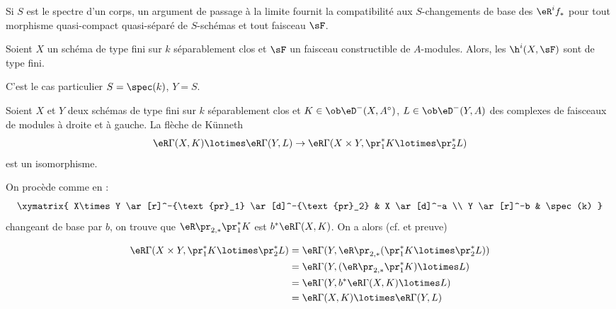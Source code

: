 Si $S$ est le spectre d'un corps, un argument de passage à la limite fournit 
la compatibilité aux $S$-changements de base des $\eR^i f_\ast$ pour tout 
morphisme quasi-compact quasi-séparé de $S$-schémas et tout faisceau 
$\sF$. 





\begin{corollary_}\label{VII:1-10}
Soient $X$ un schéma de type fini sur $k$ séparablement clos et $\sF$ un 
faisceau constructible de $A$-modules. Alors, les $\h^i(X,\sF)$ sont de type 
fini. 
\end{corollary_}

C'est le cas particulier $S=\spec(k)$, $Y=S$. 

\begin{corollary_}\label{VII:1-11}
Soient $X$ et $Y$ deux schémas de type fini sur $k$ séparablement clos et 
$K\in \ob\eD^-(X,A^\circ)$, $L\in \ob\eD^-(Y,A)$ des complexes de faisceaux de 
modules à droite et à gauche. La flèche de K\"unneth 
\[
  \eR \Gamma(X,K) \lotimes \eR \Gamma(Y,L) \to \eR\Gamma(X\times Y,\pr_1^\ast K \lotimes \pr_2^\ast L) 
\]
est un isomorphisme. 
\end{corollary_}

On procède comme en : 
\[\xymatrix{
  X\times Y \ar[r]^-{\text{pr}_1} \ar[d]^-{\text{pr}_2} 
    & X \ar[d]^-a \\
  Y \ar[r]^-b 
    & \spec(k) 
}\]
changeant de base par $b$, on trouve que 
$\eR\pr_{2,\ast}{} \pr_1^\ast K$ est 
$b^\ast \eR\Gamma(X,K)$. On a alors (cf.  et preuve) 

\begin{align*}
  \eR\Gamma(X\times Y,\pr_1^\ast K\lotimes \pr_2^\ast L) 
    &= \eR\Gamma(Y,\eR \pr_{2,\ast}(\pr_1^\ast K\lotimes \pr_2^\ast L)) \\
    &= \eR\Gamma(Y,(\eR\pr_{2,\ast}\pr_1^\ast K)\lotimes L) \\
    &= \eR\Gamma(Y,b^\ast \eR\Gamma(X,K)\lotimes L) \\
    &= \eR\Gamma(X,K)\lotimes \eR\Gamma(Y,L) 
\end{align*}





\subsection{}\label{VII:1-12}

